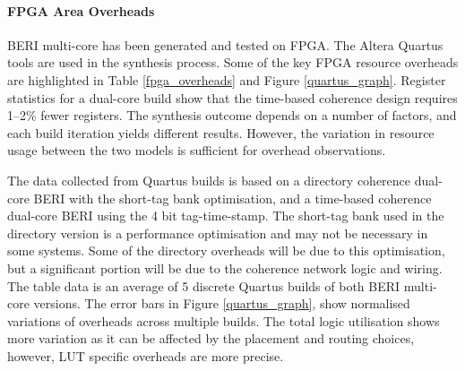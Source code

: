 	\paragraph{FPGA Area Overheads}
		BERI multi-core has been generated and tested on FPGA. The Altera Quartus tools are used in the synthesis process. Some of the key FPGA resource overheads are highlighted in Table \ref{fpga_overheads} and Figure \ref{quartus_graph}. 
		Register statistics for a dual-core build show that the time-based coherence design requires 1--2\% fewer registers. The synthesis outcome depends on a number of factors, and each build iteration yields different results. However, the variation in resource usage between the two models is sufficient for overhead observations.
		
		The data collected from Quartus builds is based on a directory coherence dual-core BERI with the short-tag bank optimisation, and a time-based coherence dual-core BERI using the 4 bit tag-time-stamp. The short-tag bank used in the directory version is a performance optimisation and may not be necessary in some systems. Some of the directory overheads will be due to this optimisation,  but a significant portion will be due to the coherence network logic and wiring. The table data is an average of 5 discrete Quartus builds of both BERI multi-core versions. The error bars in Figure \ref{quartus_graph}, show normalised variations of overheads across multiple builds. The total logic utilisation shows more variation as it can be affected by the placement and routing choices, however, LUT specific overheads are more precise.
		
		\begin{table}[t]	
		\centering
		\caption{BERI dual-core, FPGA resource overhead comparison}
		\label{fpga_overheads}
		\end{table}
		
